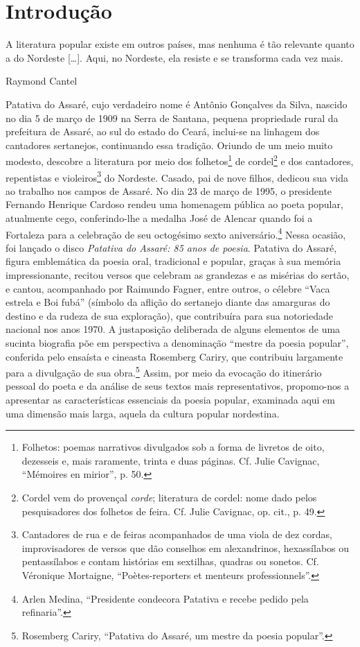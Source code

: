 
\chapter[Introdução, por Sylvie Debs]{Introdução}

\epigraph{A literatura popular existe em outros países, mas nenhuma é
tão relevante quanto a do Nordeste [\ldots{}]. Aqui, no Nordeste, ela
resiste e se transforma cada vez mais.}{Raymond Cantel\footnotemark}

Patativa do Assaré, cujo verdadeiro nome é Antônio Gonçalves da Silva, nascido
no dia 5 de março de 1909 na Serra de Santana, pequena propriedade rural da
prefeitura de Assaré, ao sul do estado do Ceará, inclui-se na linhagem dos
cantadores sertanejos, continuando essa tradição. Oriundo de um meio muito
modesto, descobre a literatura por meio dos folhetos\footnote{ Folhetos: poemas
narrativos divulgados sob a forma de livretos de oito, dezesseis e, mais
raramente, trinta e duas páginas. Cf. Julie Cavignac, ``Mémoires en
mirior'', p. 50.} de cordel\footnote{
Cordel vem do provençal \textit{corde}; literatura de cordel: nome dado pelos
pesquisadores dos folhetos de feira. Cf. Julie Cavignac, op. cit., p. 49.} e
dos cantadores, repentistas e violeiros\footnote{ Cantadores de rua e de feiras
acompanhados de uma viola de dez cordas, improvisadores de versos que dão
conselhos em alexandrinos, hexassílabos ou pentassílabos e contam histórias em
sextilhas, quadras ou sonetos. Cf. Véronique Mortaigne, “Poètes-reporters et
menteurs professionnels”.} do Nordeste. Casado, pai de nove filhos, dedicou sua
vida ao trabalho nos campos de Assaré. No dia 23 de março de
1995, o presidente Fernando Henrique Cardoso rendeu uma homenagem pública ao
poeta popular, atualmente cego, conferindo-lhe a medalha José de Alencar quando
foi a Fortaleza para a celebração de seu octogésimo sexto aniversário.\footnote{
Arlen Medina, “Presidente condecora Patativa e recebe pedido pela refinaria”.}
Nessa ocasião, foi lançado o disco \textit{Patativa do Assaré: 85 anos de poesia}.
Patativa do Assaré, figura emblemática da poesia oral, tradicional e popular,
graças à sua memória impressionante, recitou versos que celebram as grandezas e
as misérias do sertão, e cantou, acompanhado por Raimundo Fagner, entre outros, o
célebre “Vaca estrela e Boi fubá” (símbolo da aflição do sertanejo diante das
amarguras do destino e da rudeza de sua exploração), que contribuíra para sua
notoriedade nacional nos anos 1970. A justaposição deliberada de alguns
elementos de uma sucinta biografia põe em perspectiva a denominação “mestre da
poesia popular”, conferida pelo ensaísta e cineasta Rosemberg Cariry, que
contribuiu largamente para a divulgação de sua obra.\footnote{ Rosemberg Cariry,
“Patativa do Assaré, um mestre da poesia popular”.} Assim, por meio da evocação
do itinerário pessoal do poeta e da análise de seus textos mais representativos,
propomo-nos a apresentar as características essenciais da poesia popular,
examinada aqui em uma dimensão mais larga, aquela da cultura popular nordestina.

